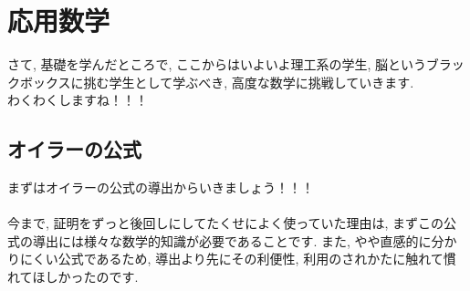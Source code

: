 \documentclass[11pt,a4paper]{jreport}
\begin{document}
\chapter{応用数学}
さて, 基礎を学んだところで, ここからはいよいよ理工系の学生, 脳というブラックボックスに挑む学生として学ぶべき, 高度な数学に挑戦していきます.\\ 
わくわくしますね！！！\\
\section{オイラーの公式 \label{euler}}
まずはオイラーの公式の導出からいきましょう！！！\\
\\
今まで, 証明をずっと後回しにしてたくせによく使っていた理由は, まずこの公式の導出には様々な数学的知識が必要であることです. また, やや直感的に分かりにくい公式であるため, 導出より先にその利便性, 利用のされかたに触れて慣れてほしかったのです.\\
\end{document}

